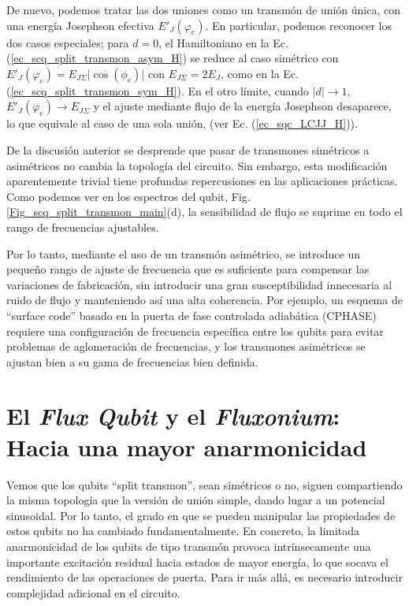     De nuevo, podemos tratar las dos uniones como un transmón de unión única, con una energía Josephson efectiva $E'_J(\varphi_e)$. En particular, podemos reconocer los dos casos especiales; para $d=0$, el Hamiltoniano en la Ec. (\ref{ec_scq_split_transmon_asym_H}) se reduce al caso simétrico con $E'_J(\varphi_e) = E_{J\varSigma} |\cos (\phi_e)$| con $E_{J\varSigma} = 2E_J$, como en la Ec. (\ref{ec_scq_split_transmon_sym_H}). En el otro límite, cuando $|d| \rightarrow 1$, $E'_J(\varphi_e) \rightarrow E_{J\Sigma}$ y el ajuste mediante flujo de la energía Josephson desaparece, lo que equivale al caso de una sola unión, (ver Ec. (\ref{ec_sqc_LCJJ_H})).

    De la discusión anterior se desprende que pasar de transmones simétricos a asimétricos no cambia la topología del circuito. Sin embargo, esta modificación aparentemente trivial tiene profundas repercusiones en las aplicaciones prácticas. Como podemos ver en los espectros del qubit, Fig. \ref{Fig_scq_split_transmon_main}(d), la sensibilidad de flujo se suprime en todo el rango de frecuencias ajustables.  
    
    Por lo tanto, mediante el uso de un transmón asimétrico, se introduce un pequeño rango de ajuste de frecuencia que es suficiente para compensar las variaciones de fabricación, sin introducir una gran susceptibilidad innecesaria al ruido de flujo y manteniendo así una alta coherencia. Por ejemplo, un esquema de ``surface code'' basado en la puerta de fase controlada adiabática (CPHASE) requiere una configuración de frecuencia específica entre los qubits para evitar problemas de aglomeración de frecuencias, y los transmones asimétricos se ajustan bien a su gama de frecuencias bien definida.

    






\clearpage
\newpage
\section{El \textit{Flux Qubit} y el \textit{Fluxonium}: Hacia una mayor anarmonicidad} \label{sec_scq_flux_qubits_y_fluxonium}

Vemos que los qubits ``split transmon'', sean simétricos o no, siguen compartiendo la misma topología que la versión de unión simple, dando lugar a un potencial sinusoidal. Por lo tanto, el grado en que se pueden manipular las propiedades de estos qubits no ha cambiado fundamentalmente. En concreto, la limitada anarmonicidad de los qubits de tipo transmón provoca intrínsecamente una importante excitación residual hacia estados de mayor energía, lo que socava el rendimiento de las operaciones de puerta. Para ir más allá, es necesario introducir complejidad adicional en el circuito.


